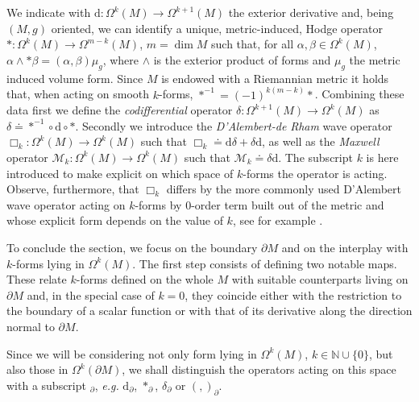 We indicate with $\mathrm{d}:\Omega^k(M)\to\Omega^{k+1}(M)$ the exterior derivative and, being $(M,g)$ oriented, we can identify a unique, metric-induced, Hodge operator $\ast:\Omega^k(M)\to\Omega^{m-k}(M)$, $m=\dim M$ such that, for all $\alpha,\beta\in\Omega^k(M)$, $\alpha\wedge\ast\beta=(\alpha,\beta)\mu_g$, where $\wedge$ is the exterior product of forms and $\mu_g$ the metric induced volume form. Since $M$ is endowed with a Riemannian metric it holds that, when acting on smooth $k$-forms, $\ast^{-1}=(-1)^{k(m-k)}\ast$. Combining these data first we define the {\em codifferential} operator $\delta:\Omega^{k+1}(M)\to\Omega^k(M)$ as $\delta\doteq\ast^{-1}\circ \mathrm{d}\circ\ast$. Secondly we introduce the {\em D'Alembert-de Rham} wave operator $\Box_k:\Omega^k(M)\to\Omega^k(M)$ such that $\Box_k\doteq \mathrm{d}\delta+\delta \mathrm{d}$, as well as the {\em Maxwell} operator $\mathcal{M}_k:\Omega^k(M)\to\Omega^k(M)$ such that $\mathcal{M}_k\doteq\delta \mathrm{d}$. The subscript $k$ is here introduced to make explicit on which space of $k$-forms the operator is acting. Observe, furthermore, that $\Box_k$ differs by the more commonly used D'Alembert wave operator acting on $k$-forms by $0$-order term built out of the metric and whose explicit form depends on the value of $k$, see for example \cite[Sec. II]{Pfenning:2009nx}.

To conclude the section, we focus on the boundary $\partial M$ and on the interplay with $k$-forms lying in $\Omega^k(M)$. The first step consists of defining two notable maps. These relate $k$-forms defined on the whole $M$ with suitable counterparts living on $\partial M$ and, in the special case of $k=0$, they coincide either with the restriction to the boundary of a scalar function or with that of its derivative along the direction normal to $\partial M$.

\begin{remark}
	Since we will be considering not only form lying in $\Omega^k(M)$, $k\in\mathbb{N}\cup\{0\}$, but also those in $\Omega^k(\partial M)$, we shall distinguish the operators acting on this space with a subscript $_\partial$, {\it e.g.} $\mathrm{d}_\partial$, $\ast_\partial$, $\delta_\partial$ or $(,)_\partial$.
\end{remark}

